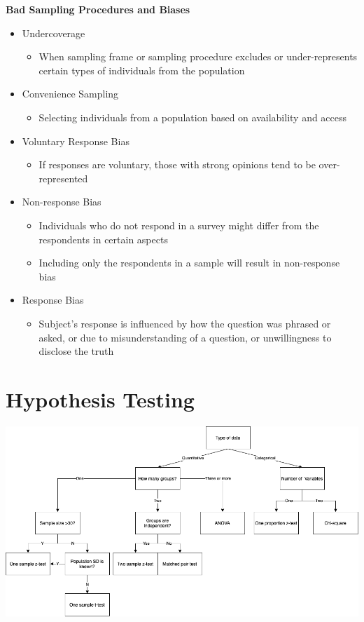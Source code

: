\documentclass{article}
\begin{document}
\noindent
\textbf{Bad Sampling Procedures and Biases}
\begin{itemize}
    \item Undercoverage
    \begin{itemize}
        \item When sampling frame or sampling procedure excludes or under-represents certain types of individuals from the population 
    \end{itemize}
    \item Convenience Sampling
    \begin{itemize}
        \item Selecting individuals from a population based on availability and access
    \end{itemize}
    \item Voluntary Response Bias
    \begin{itemize}
        \item If responses are voluntary, those with strong opinions tend to be over-represented 
    \end{itemize}
    \item Non-response Bias
    \begin{itemize}
        \item Individuals who do not respond in a survey might differ from the respondents in certain aspects
        \item Including only the respondents in a sample will result in non-response bias
    \end{itemize}
    \item Response Bias
    \begin{itemize}
        \item Subject's response is influenced by how the question was phrased or asked, or due to misunderstanding of a question, or unwillingness to disclose the truth 
    \end{itemize}
\end{itemize}
\section{Hypothesis Testing}
\includegraphics[scale = 0.5]{dec-tree.png}
\end{document}
